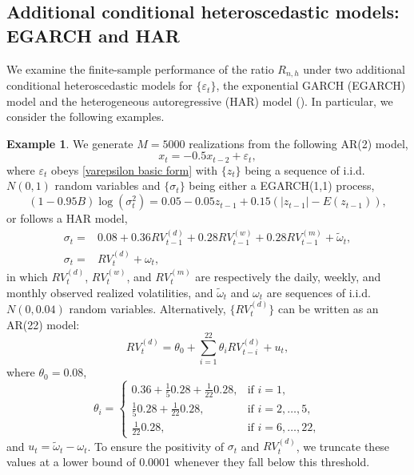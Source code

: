 \documentclass[ejsv2]{imsart}
\theoremstyle{plain}
\theoremstyle{definition}
\newtheorem{example}{Example}[section]
\theoremstyle{remark}
\begin{document}
\subsection{Additional conditional heteroscedastic models: EGARCH and HAR}\label{sec:add EGARCH HAR}
We examine the finite-sample performance of the ratio $R_{n,h}$ under two additional conditional heteroscedastic models for $\{\varepsilon_t\}$, the exponential GARCH (EGARCH) model and the heterogeneous autoregressive (HAR) model (\cite{Corsi2009}). In particular, we consider the following examples.

\begin{example}\label{exS.EGARCH HAR AR2}
We generate $M=5000$ realizations from the following AR(2) model,
\begin{equation*}%
x_t=-0.5 x_{t-2}+\varepsilon_t,
\end{equation*}
where 
$\varepsilon_t$ obeys
\eqref{varepsilon basic form} with $\{z_t\}$ being a sequence of
i.i.d. $N(0,1)$ random variables
and $\{\sigma_t\}$ being either a EGARCH(1,1) process,
\begin{equation*}
(1-0.95B)\log(\sigma_t^2)=0.05-0.05z_{t-1}+0.15(|z_{t-1}|-E(z_{t-1})),
\end{equation*}
or follows a HAR model,
\begin{equation*}
\begin{split}
   \sigma_t= & 0.08+0.36RV^{(d)}_{t-1}+0.28RV_{t-1}^{(w)}+0.28RV_{t-1}^{(m)}+\tilde{\omega}_{t}, \\
   \sigma_t= & RV^{(d)}_{t}+{\omega}_{t},
\end{split}
\end{equation*}
in which $RV^{(d)}_{t}$, $RV_{t}^{(w)}$, and $RV_{t}^{(m)}$ are respectively the daily, weekly, and monthly observed realized volatilities, and $\tilde{\omega}_{t}$ and ${\omega}_{t}$ are sequences of i.i.d. $N(0,0.04)$ random variables. Alternatively, $\{RV^{(d)}_{t}\}$ can be written as an AR(22) model:
\begin{equation*}
RV^{(d)}_{t}=\theta_0+\sum_{i=1}^{22}\theta_{i}RV^{(d)}_{t-i}+u_t,
\end{equation*}
where $\theta_0=0.08$,
\begin{equation*}
\theta_i=
  \begin{cases}
    0.36+\frac{1}{5}0.28+\frac{1}{22}0.28, & \mbox{if } i=1, \\
    \frac{1}{5}0.28+\frac{1}{22}0.28, & \mbox{if } i=2,\ldots,5, \\
    \frac{1}{22}0.28, & \mbox{if } i=6,\ldots,22,
  \end{cases}
\end{equation*}
and $u_t=\tilde{\omega}_{t}-{\omega}_{t}$. To ensure the positivity of $\sigma_t$ and $RV^{(d)}_{t}$, we truncate these values at a lower bound of 0.0001 whenever they fall below this threshold.
\end{example}
\end{document}
